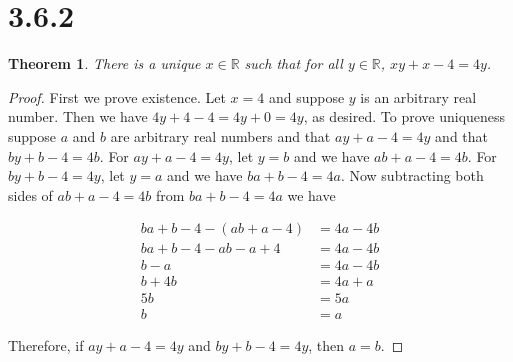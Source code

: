 \documentclass{article}
\newtheorem*{theorem}{Theorem}  %
\begin{document}
\section*{3.6.2}
\begin{theorem} There is a unique $x \in \mathbb{R}$ such that for all $y \in \mathbb{R}$, $xy + x - 4 = 4y$.
\end{theorem}
\begin{proof}
First we prove existence. Let $x = 4$ and suppose $y$ is an arbitrary real number. Then we have $4y + 4 - 4 = 4y + 0 = 4y$, as desired. To prove uniqueness suppose $a$ and $b$ are arbitrary real numbers and that $ay + a - 4 = 4y$ and that $by + b - 4 = 4b$. For $ay + a - 4 = 4y$, let $y = b$ and we have $ab + a - 4 = 4b$. For $by + b - 4 = 4y$, let $y = a$ and we have $ba + b - 4 = 4a$. Now subtracting both sides of $ab + a - 4 = 4b$ from $ba + b - 4 = 4a$ we have

\begin{align*}
ba + b - 4 - (ab + a - 4) &= 4a - 4b \\
ba + b - 4 - ab - a + 4 &= 4a - 4b \\
b - a &= 4a - 4b \\
b + 4b &= 4a + a \\
5b &= 5a \\
b &= a
\end{align*}

Therefore, if $ay + a - 4 = 4y$ and $by + b - 4 = 4y$, then $a = b$.

\end{proof}
\end{document}
